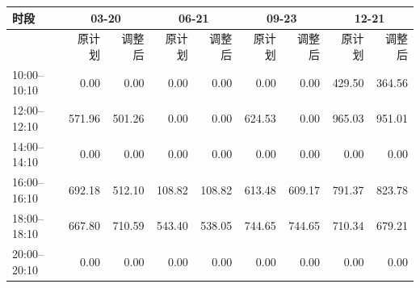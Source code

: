 \begin{tabular}{lrrrrrrrr}
\toprule
时段 & \multicolumn{2}{c}{03-20} & \multicolumn{2}{c}{06-21} & \multicolumn{2}{c}{09-23} & \multicolumn{2}{c}{12-21} \\
\midrule
 & 原计划 & 调整后 & 原计划 & 调整后 & 原计划 & 调整后 & 原计划 & 调整后 \\
10:00--10:10 & 0.00 & 0.00 & 0.00 & 0.00 & 0.00 & 0.00 & 429.50 & 364.56 \\
12:00--12:10 & 571.96 & 501.26 & 0.00 & 0.00 & 624.53 & 0.00 & 965.03 & 951.01 \\
14:00--14:10 & 0.00 & 0.00 & 0.00 & 0.00 & 0.00 & 0.00 & 0.00 & 0.00 \\
16:00--16:10 & 692.18 & 512.10 & 108.82 & 108.82 & 613.48 & 609.17 & 791.37 & 823.78 \\
18:00--18:10 & 667.80 & 710.59 & 543.40 & 538.05 & 744.65 & 744.65 & 710.34 & 679.21 \\
20:00--20:10 & 0.00 & 0.00 & 0.00 & 0.00 & 0.00 & 0.00 & 0.00 & 0.00 \\
\bottomrule
\end{tabular}